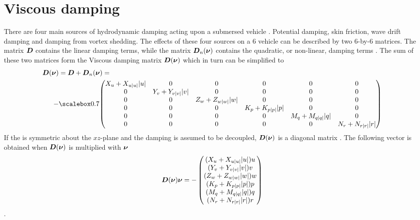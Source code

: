 \section{Viscous damping}
There are four main sources of hydrodynamic damping acting upon a submersed vehicle \citep[p.122]{fossen2011}.
Potential damping, skin friction, wave drift damping and damping from vortex shedding. The effects of these four sources on a 6 \abbrDOF vehicle can be described by two 6-by-6 matrices.
The matrix $\boldsymbol{D}$ contains the linear damping terms, while the matrix $\boldsymbol{D}_{n}(\boldsymbol{\nu})$ contains the quadratic, or non-linear, damping terms \citep{fossen2011}. The sum of these two matrices form the Viscous damping matrix $\boldsymbol{D}(\boldsymbol{\nu})$ which in turn can be simplified to
\begin{equation}
\begin{split}
    \damping(\nuVector) &= \damping + \damping_{n}(\nuVector) = \\
    -& \scalemath{0.7}{\begin{pmatrix}
        \Xu+\Xuabsu\abs{u} & 0 & 0 & 0 & 0 & 0 \\
        0 & \Yv+\Yvabsv\abs{v} & 0 & 0 & 0 & 0 \\
        0 & 0 & \Zw+\Zwabsw\abs{w} & 0 & 0 & 0 \\
        0 & 0 & 0 & \Kp+\Kpabsp\abs{p} & 0 & 0 \\
        0 & 0 & 0 & 0 & \Mq+\Mqabsq\abs{q} & 0 \\
        0 & 0 & 0 & 0 & 0 & \Nr+\Nrabsr\abs{r} \\
    \end{pmatrix}}
\end{split}
\end{equation}
If the \abbrROV is symmetric about the $xz$-plane and the damping is assumed to be decoupled, $\boldsymbol{D}(\boldsymbol{\nu})$ is a diagonal matrix \citep[p.129-130]{fossen2011}. The following vector is obtained when $\boldsymbol{D}(\boldsymbol{\nu})$ is multiplied with $\boldsymbol{\nu}$
\begin{equation}
    \boldsymbol{D}(\boldsymbol{\nu}) \boldsymbol{\nu} =
     -\begin{pmatrix}
    (X_{u} + X_{u|u|} |u|) u\\
    (Y_{v} + Y_{v|v|} |v|) v\\
    (Z_{w} + Z_{w|w|} |w|) w\\
    (K_{p} + K_{p|p|} |p|) p\\
    (M_{q} + M_{q|q|} |q|) q\\
    (N_{r} + N_{r|r|} |r|) r\\
    \end{pmatrix}    
\end{equation}.

